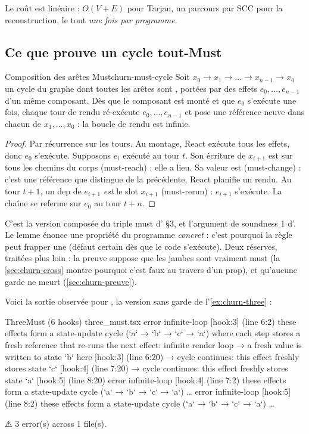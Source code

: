 Le coût est linéaire : $O(V + E)$ pour Tarjan, un parcours par SCC pour la reconstruction,
le tout \emph{une fois par programme}.

\subsection{Ce que prouve un cycle tout-Must}

\begin{lemme}{Composition des arêtes Must}{churn-must-cycle}
Soit $x_0 \to x_1 \to \dots \to x_{n-1} \to x_0$ un cycle du graphe dont toutes les arêtes
sont , portées par des effets $e_0, \dots, e_{n-1}$ d'un même composant. Dès que
le composant est monté et que $e_0$ s'exécute une fois, chaque tour de rendu ré-exécute
$e_0, \dots, e_{n-1}$ et pose une référence neuve dans chacun de $x_1, \dots, x_0$ : la
boucle de rendu est infinie.
\end{lemme}
\begin{proof}
Par récurrence sur les tours. Au montage, React exécute tous les effets, donc $e_0$
s'exécute. Supposons $e_i$ exécuté au tour $t$. Son écriture de $x_{i+1}$ est sur tous les
chemins du corps (must-reach) : elle a lieu. Sa valeur est  (must-change) :
c'est une référence que  distingue de la précédente, React planifie un
rendu. Au tour $t+1$, un dep de $e_{i+1}$ \emph{est} le slot $x_{i+1}$ (must-rerun) :
$e_{i+1}$ s'exécute. La chaîne se referme sur $e_0$ au tour $t+n$.
\end{proof}

C'est la version composée du triple must d' \S3, et l'argument de soundness 1
d'. Le lemme énonce une propriété du programme \emph{concret} : c'est pourquoi la
règle peut frapper une \Error{} (\og défaut certain dès que le code s'exécute\fg). Deux
réserves, traitées plus loin : la preuve suppose que les jambes sont vraiment must (la
\cref{sec:churn-cross} montre pourquoi c'est faux au travers d'un prop), et qu'aucune
garde ne meurt (\cref{sec:churn-preuve}).

Voici la sortie observée pour , la version sans garde de
l'\cref{ex:churn-three} :

\begin{sortie}
  ThreeMust  (6 hooks)  three_must.tsx
    error  infinite-loop  [hook:3]  (line 6:2)  these effects form a state-update cycle (`a` → `b` → `c` → `a`) where each step stores a fresh reference that re-runs the next effect: infinite render loop
       → a fresh value is written to state `b` here [hook:3] (line 6:20)
       → cycle continues: this effect freshly stores state `c` [hook:4] (line 7:20)
       → cycle continues: this effect freshly stores state `a` [hook:5] (line 8:20)
    error  infinite-loop  [hook:4]  (line 7:2)  these effects form a state-update cycle (`a` → `b` → `c` → `a`) …
    error  infinite-loop  [hook:5]  (line 8:2)  these effects form a state-update cycle (`a` → `b` → `c` → `a`) …

⚠  3 error(s) across 1 file(s).
\end{sortie}

